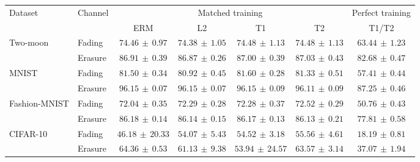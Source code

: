 \begin{tabular*}{\linewidth}{@{\extracolsep{\fill}}llccccc@{}}
\toprule
\multirow{2}{*}{Dataset} & \multirow{2}{*}{Channel} & \multicolumn{4}{c}{Matched training} & Perfect training \\
\cmidrule(lr){3-6}\cmidrule(l){7-7}
 & & ERM & L2 & T1 & T2 & T1/T2 \\
\midrule
\multirow{2}{*}{Two-moon} & Fading & $74.46\,\pm\,0.97$ & $74.38\,\pm\,1.05$ & $74.48\,\pm\,1.13$ & $\mathbf{74.48}\,\pm\,1.13$ & $63.44\,\pm\,1.23$ \\
 & Erasure & $86.91\,\pm\,0.39$ & $86.87\,\pm\,0.26$ & $87.00\,\pm\,0.39$ & $\mathbf{87.03}\,\pm\,0.43$ & $82.68\,\pm\,0.47$ \\
\midrule[0.25pt]
\multirow{2}{*}{MNIST} & Fading & $81.50\,\pm\,0.34$ & $80.92\,\pm\,0.45$ & $\mathbf{81.60}\,\pm\,0.28$ & $81.33\,\pm\,0.51$ & $57.41\,\pm\,0.44$ \\
 & Erasure & $\mathbf{96.15}\,\pm\,0.07$ & $96.15\,\pm\,0.07$ & $96.15\,\pm\,0.09$ & $96.11\,\pm\,0.09$ & $87.25\,\pm\,0.46$ \\
\midrule[0.25pt]
\multirow{2}{*}{Fashion-MNIST} & Fading & $72.04\,\pm\,0.35$ & $72.29\,\pm\,0.28$ & $72.28\,\pm\,0.37$ & $\mathbf{72.52}\,\pm\,0.29$ & $50.76\,\pm\,0.43$ \\
 & Erasure & $\mathbf{86.18}\,\pm\,0.14$ & $86.14\,\pm\,0.15$ & $86.17\,\pm\,0.13$ & $86.13\,\pm\,0.21$ & $77.81\,\pm\,0.58$ \\
\midrule[0.25pt]
\multirow{2}{*}{CIFAR-10} & Fading & $46.18\,\pm\,20.33$ & $54.07\,\pm\,5.43$ & $54.52\,\pm\,3.18$ & $\mathbf{55.56}\,\pm\,4.61$ & $18.19\,\pm\,0.81$ \\
 & Erasure & $\mathbf{64.36}\,\pm\,0.53$ & $61.13\,\pm\,9.38$ & $53.94\,\pm\,24.57$ & $63.57\,\pm\,3.14$ & $37.07\,\pm\,1.94$ \\
\bottomrule
\end{tabular*}

